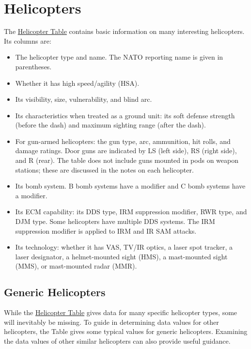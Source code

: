 
\chapter{Helicopters}

The \hyperlink{table:helicopter}{Helicopter Table} contains basic information on many interesting helicopters. Its columns are:
\begin{itemize}
    \item The helicopter type and name. The NATO reporting name is given in parentheses.
    \item Whether it has high speed/agility (HSA).
    \item Its visibility, size, vulnerability, and blind arc.
    \item Its characteristics when treated as a ground unit: its soft defense strength (before the dash) and maximum sighting range (after the dash).
    \item For gun-armed helicopters: the gun type, arc, ammunition, hit rolls, and damage ratings. Door guns are indicated by LS (left side), RS (right side), and R (rear). The table does not include guns mounted in pods on weapon stations; these are discussed in the notes on each helicopter.
    \item Its bomb system. B bomb systems have a  modifier and C bomb systems have a  modifier.
    \item Its ECM capability: its DDS type, IRM suppression modifier, RWR type, and DJM type. Some helicopters have multiple DDS systems. The IRM suppression modifier is applied to IRM and IR SAM attacks.
    \item Its technology: whether it has VAS, TV/IR optics, a laser spot tracker, a laser designator, a helmet-mounted sight (HMS), a mast-mounted sight (MMS), or mast-mounted radar (MMR).
\end{itemize}

\section{Generic Helicopters}

While the \hyperlink{table:helicopter}{Helicopter Table} gives data for many specific helicopter types, some will inevitably be missing. To guide in determining data values for other helicopters, the Table gives some typical values for generic helicopters. Examining the data values of other similar helicopters can also provide useful guidance.


